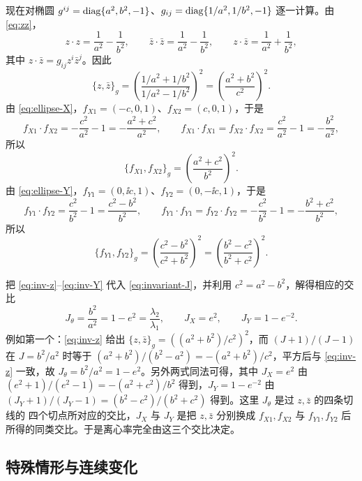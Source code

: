 现在对椭圆 $g^{ij}=\operatorname{diag}\{a^2,b^2,-1\}$、$g_{ij}=\operatorname{diag}\{1/a^2,1/b^2,-1\}$ 逐一计算。由
\eqref{eq:zz}，
\[
z\cdot z=\frac{1}{a^2}-\frac{1}{b^2},\qquad
\bar z\cdot\bar z=\frac{1}{a^2}-\frac{1}{b^2},\qquad
z\cdot\bar z=\frac{1}{a^2}+\frac{1}{b^2},
\]
其中 $z\cdot\bar z=g_{ij}z^i\bar z^j$。因此
\begin{equation}
\{z,\bar z\}_g
=\left(\frac{1/a^2+1/b^2}{1/a^2-1/b^2}\right)^2
=\left(\frac{a^2+b^2}{c^2}\right)^2 .
\label{eq:inv-z}
\end{equation}
由 \eqref{eq:ellipse-X}，$f_{X1}=(-c,0,1)$、$f_{X2}=(c,0,1)$，于是
\[
f_{X1}\cdot f_{X2}=-\frac{c^2}{a^2}-1=-\frac{a^2+c^2}{a^2},\qquad
f_{X1}\cdot f_{X1}=f_{X2}\cdot f_{X2}=\frac{c^2}{a^2}-1=-\frac{b^2}{a^2},
\]
所以
\begin{equation}
\{f_{X1},f_{X2}\}_g
=\left(\frac{a^2+c^2}{b^2}\right)^2 .
\label{eq:inv-X}
\end{equation}
由 \eqref{eq:ellipse-Y}，$f_{Y1}=(0,\ii c,1)$、$f_{Y2}=(0,-\ii c,1)$，于是
\[
f_{Y1}\cdot f_{Y2}=\frac{c^2}{b^2}-1=\frac{c^2-b^2}{b^2},\qquad
f_{Y1}\cdot f_{Y1}=f_{Y2}\cdot f_{Y2}=-\frac{c^2}{b^2}-1=-\frac{b^2+c^2}{b^2},
\]
所以
\begin{equation}
\{f_{Y1},f_{Y2}\}_g
=\left(\frac{c^2-b^2}{c^2+b^2}\right)^2
=\left(\frac{b^2-c^2}{b^2+c^2}\right)^2 .
\label{eq:inv-Y}
\end{equation}

把 \eqref{eq:inv-z}--\eqref{eq:inv-Y} 代入 \eqref{eq:invariant-J}，并利用
$c^2=a^2-b^2$，解得相应的交比
\begin{equation}
J_\theta=\frac{b^2}{a^2}=1-e^2=\frac{\lambda_2}{\lambda_1},\qquad
J_X=e^2,\qquad
J_Y=1-e^{-2}.
\label{eq:J}
\end{equation}
例如第一个：\eqref{eq:inv-z} 给出 $\{z,\bar z\}_g=((a^2+b^2)/c^2)^2$，而
$(J+1)/(J-1)$ 在 $J=b^2/a^2$ 时等于 $(a^2+b^2)/(b^2-a^2)=-(a^2+b^2)/c^2$，平方后与
\eqref{eq:inv-z} 一致，故 $J_\theta=b^2/a^2=1-e^2$。另外两式同法可得，其中 $J_X=e^2$ 由
$(e^2+1)/(e^2-1)=-(a^2+c^2)/b^2$ 得到，$J_Y=1-e^{-2}$ 由
$(J_Y+1)/(J_Y-1)=(b^2-c^2)/(b^2+c^2)$ 得到。这里 $J_\theta$ 是过 $z,\bar z$ 的四条切线的
四个切点所对应的交比，$J_X$ 与 $J_Y$ 是把 $z,\bar z$ 分别换成 $f_{X1},f_{X2}$ 与
$f_{Y1},f_{Y2}$ 后所得的同类交比。于是离心率完全由这三个交比决定。

\subsection{特殊情形与连续变化}

